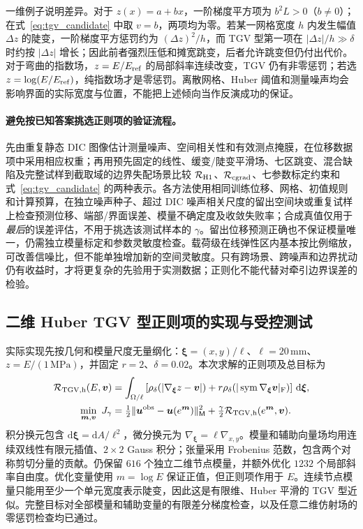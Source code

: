 \documentclass[11pt,a4paper]{ctexart}
\begin{document}
一维例子说明差异。对于 $z(x)=a+bx$，一阶梯度平方项为 $b^2L>0$（$b\ne0$）；在式~\eqref{eq:tgv_candidate} 中取 $v=b$，两项均为零。若某一网格宽度 $h$ 内发生幅值 $\Delta z$ 的陡变，一阶梯度平方惩罚约为 $(\Delta z)^2/h$，而 TGV 型第一项在 $|\Delta z|/h\gg\delta$ 时约按 $|\Delta z|$ 增长；因此前者强烈压低和摊宽跳变，后者允许跳变但仍付出代价。对于弯曲的指数场，$z=E/E_{\rm ref}$ 的局部斜率连续改变，TGV 仍有非零惩罚；若选 $z=\log(E/E_{\rm ref})$，纯指数场才是零惩罚。离散网格、Huber 阈值和测量噪声均会影响界面的实际宽度与位置，不能把上述倾向当作反演成功的保证。

\paragraph{避免按已知答案挑选正则项的验证流程。}
先由重复静态 DIC 图像估计测量噪声、空间相关性和有效测点掩膜，在位移数据项中采用相应权重；再用预先固定的线性、缓变/陡变平滑场、七区跳变、混合缺陷及完整试样到截取域的边界失配场景比较 $\mathcal R_{\rm H1}$、$\mathcal R_{\rm cgrad}$、七参数标定约束和式~\eqref{eq:tgv_candidate} 的两种表示。各方法使用相同训练位移、网格、初值规则和计算预算，在独立噪声种子、超过 DIC 噪声相关尺度的留出空间块或重复试样上检查预测位移、端部/界面误差、模量不确定度及收敛失败率；合成真值仅用于\emph{最后}的误差评估，不用于挑选该测试样本的 $\gamma$。留出位移预测正确也不保证模量唯一，仍需独立模量标定和参数灵敏度检查。载荷级在线弹性区内基本按比例缩放，可改善信噪比，但不能单独增加新的空间灵敏度。只有跨场景、跨噪声和边界扰动仍有收益时，才将更复杂的先验用于实测数据；正则化不能代替对牵引边界误差的检验。

\subsection{二维 Huber TGV 型正则项的实现与受控测试}
实际实现先按几何和模量尺度无量纲化：$\boldsymbol\xi=(x,y)/\ell$、$\ell=20\,\mathrm{mm}$、$z=E/(1\,\mathrm{MPa})$，并固定 $r=2$、$\delta=0.02$。本次求解的正则项及总目标为
\begin{align}
 \mathcal R_{\rm TGV,h}(E,\boldsymbol v)
 &=\int_{\Omega/\ell}\left[\rho_\delta(|\nabla_{\boldsymbol\xi}z-\boldsymbol v|)
 +r\rho_\delta(|\operatorname{sym}\nabla_{\boldsymbol\xi}\boldsymbol v|_{\rm F})\right]\,\mathrm d\boldsymbol\xi,
 \\
 \min_{\boldsymbol m,\boldsymbol v}\ J_\gamma
 &=\tfrac12\|\boldsymbol u^{\rm obs}-\boldsymbol u(e^{\boldsymbol m})\|_{\mathsf M}^2
 +\tfrac\gamma2\mathcal R_{\rm TGV,h}(e^{\boldsymbol m},\boldsymbol v).
\end{align}
积分换元包含 $\mathrm d\boldsymbol\xi=\mathrm dA/\ell^2$，微分换元为 $\nabla_{\boldsymbol\xi}=\ell\nabla_{x,y}$。模量和辅助向量场均用连续双线性有限元插值、$2\times2$ Gauss 积分；张量采用 Frobenius 范数，包含两个对称剪切分量的贡献。仍保留 $616$ 个独立二维节点模量，并额外优化 $1232$ 个局部斜率自由度。优化变量使用 $m=\log E$ 保证正值，但正则项作用于 $E$。连续节点模量只能用至少一个单元宽度表示陡变，因此这是有限维、Huber 平滑的 TGV 型近似。完整目标对全部模量和辅助变量的有限差分梯度检查，以及任意二维仿射场的零惩罚检查均已通过。
\end{document}
